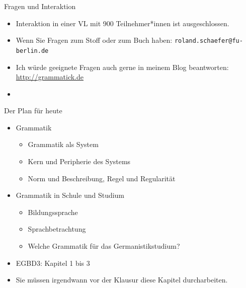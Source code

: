 \begin{frame}
  {Fragen und Interaktion}
  \begin{itemize}
    \item Interaktion in einer VL mit 900 Teilnehmer*innen ist ausgeschlossen.
      \vspace{\baselineskip}
    \item Wenn Sie Fragen zum Stoff oder zum Buch haben:
      \texttt{roland.schaefer@fu-berlin.de}
    \item Ich würde geeignete Fragen auch gerne in meinem Blog beantworten:\\
      \url{http://grammatick.de}
      \vspace{\baselineskip}
    \item {}
  \end{itemize}
\end{frame}

\begin{frame}
  {Der Plan für heute}
  \pause
  \begin{itemize}
    \item Grammatik
      \begin{itemize}
        \item Grammatik als System
        \item Kern und Peripherie des Systems
        \item Norm und Beschreibung, Regel und Regularität
      \end{itemize}
      \vspace{\baselineskip}
      \pause
    \item Grammatik in Schule und Studium
      \begin{itemize}
        \item Bildungssprache
        \item Sprachbetrachtung
        \item Welche Grammatik für das Germanistikstudium?
      \end{itemize}
      \vspace{\baselineskip}
      \pause
    \item EGBD3: Kapitel 1 bis 3
      \pause
    \item \alert{Sie müssen irgendwann vor der Klausur diese Kapitel durcharbeiten.}
  \end{itemize}
\end{frame}



